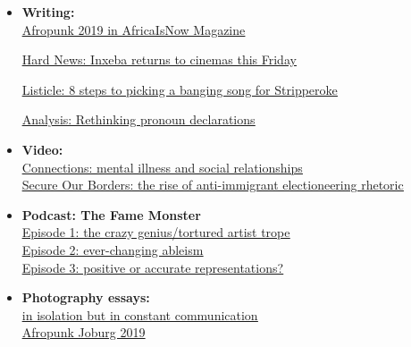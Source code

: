 \documentclass[10pt,a4paper]{altacv}
\begin{document}
\begin{itemize}
\item \textbf{Writing:}\\ 
\href{https://africaisnowmag.com/afropunk-2019/}{\underline{Afropunk 2019 in AfricaIsNow Magazine}}

\href{https://thequeercalendar.wordpress.com/2018/03/07/inxeba-returns-to-cinemas-this-friday/}{\underline{Hard News: Inxeba returns to cinemas this Friday}}

\href{https://thequeercalendar.wordpress.com/2018/03/03/8-steps-to-picking-a-banging-song-for-stripperoke/}{\underline{Listicle: 8 steps to picking a banging song for Stripperoke }}


\href{https://thequeercalendar.wordpress.com/2018/08/13/rethinking-pronoun-declarations/}{\underline{Analysis: Rethinking pronoun declarations}}


\item \textbf{Video:} \\

\href{https://vimeo.com/386945095}{\underline{Connections: mental illness and social relationships}}\\

\href{https://vimeo.com/337621644}{\underline{Secure Our Borders: the rise of anti-immigrant electioneering rhetoric}}

\item \textbf{Podcast: The Fame Monster} \\
\href{https://soundcloud.com/carbonatedart/the-fame-monster-episode-1}{\underline{Episode 1: the crazy genius/tortured artist trope }}\\ 
\href{https://soundcloud.com/carbonatedart/the-fame-monster-episode-2}{\underline{Episode 2: ever-changing ableism }}\\ 
\href{https://soundcloud.com/carbonatedart/the-fame-monster-episode-3}{\underline{Episode 3: positive or accurate representations?}}\\ 

\item \textbf{Photography essays:}\\ 
\href{https://www.behance.net/gallery/81061435/in-isolation-but-in-constant-communication}{\underline{in isolation but in constant communication}}\\
\href{https://www.behance.net/gallery/91203941/Afropunk-Joburg-2019}{\underline{Afropunk Joburg 2019}}

\end{itemize}
\quad



\end{document}
